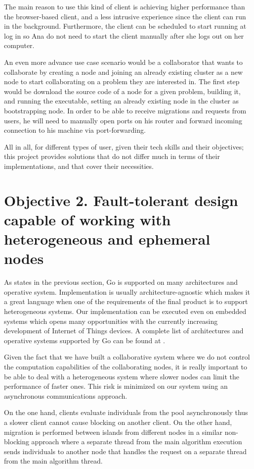 The main reason to use this kind of client is achieving higher performance than the browser-based client, and a less intrusive experience since the client can run in the background. Furthermore, the client can be scheduled to start running at log in so Ana do not need to start the client manually after she logs out on her computer.

An even more advance use case scenario would be a collaborator that wants to collaborate by creating a node and joining an already existing cluster as a new node to start collaborating on a problem they are interested in. The first step would be download the source code of a node for a given problem, building it, and running the executable, setting an already existing node in the cluster as bootstrapping node. In order to be able to receive migrations and requests from users, he will need to manually open ports on his router and forward incoming connection to his machine via port-forwarding.

All in all, for different types of user, given their tech skills and their objectives; this project provides solutions that do not differ much in terms of their implementations, and that cover their necessities.

\section{Objective 2. Fault-tolerant design capable of working with heterogeneous and ephemeral nodes}

As states in the previous section, Go is supported on many architectures and operative system. Implementation is usually architecture-agnostic which makes it a great language when one of the requirements of the final product is to support heterogeneous systems. Our implementation can be executed even on embedded systems which opens many opportunities with the currently increasing development of Internet of Things devices. A complete list of architectures and operative systems supported by Go can be found at \cite{go-architectures}.

Given the fact that we have built a collaborative system where we do not control the computation capabilities of the collaborating nodes, it is really important to be able to deal with a heterogeneous system where slower nodes can limit the performance of faster ones. This risk is minimized on our system using an asynchronous communications approach. 

On the one hand, clients evaluate individuals from the pool asynchronously thus a slower client cannot cause blocking on another client. On the other hand, migration is performed between islands from different nodes in a similar non-blocking approach where a separate thread from the main algorithm execution sends individuals to another node that handles the request on a separate thread from the main algorithm thread.

